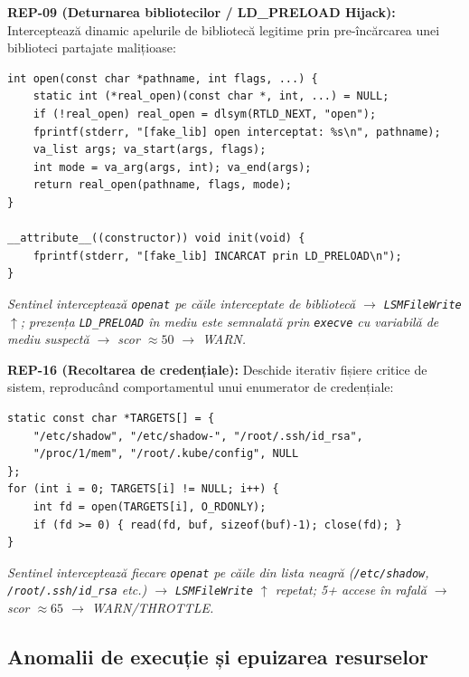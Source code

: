 \par \textbf{REP-09 (Deturnarea bibliotecilor / LD\_PRELOAD Hijack):} Interceptează dinamic apelurile de bibliotecă legitime prin pre-încărcarea unei biblioteci partajate malițioase:

\begin{lstlisting}[style=cstyle,caption={REP-09: Bibliotecă malițioasă pre-încărcată via LD\_PRELOAD}]
int open(const char *pathname, int flags, ...) {
    static int (*real_open)(const char *, int, ...) = NULL;
    if (!real_open) real_open = dlsym(RTLD_NEXT, "open");
    fprintf(stderr, "[fake_lib] open interceptat: %s\n", pathname);
    va_list args; va_start(args, flags);
    int mode = va_arg(args, int); va_end(args);
    return real_open(pathname, flags, mode);
}

__attribute__((constructor)) void init(void) {
    fprintf(stderr, "[fake_lib] INCARCAT prin LD_PRELOAD\n");
}
\end{lstlisting}
\par\textit{Sentinel interceptează \texttt{openat} pe căile interceptate de bibliotecă $\rightarrow$ \texttt{LSMFileWrite} $\uparrow$; prezența \texttt{LD\_PRELOAD} în mediu este semnalată prin \texttt{execve} cu variabilă de mediu suspectă $\rightarrow$ scor $\approx 50$ $\rightarrow$ WARN.}

\par \textbf{REP-16 (Recoltarea de credențiale):} Deschide iterativ fișiere critice de sistem, reproducând comportamentul unui enumerator de credențiale:

\begin{lstlisting}[style=cstyle,caption={REP-16: Enumerarea fișierelor cu credențiale}]
static const char *TARGETS[] = {
    "/etc/shadow", "/etc/shadow-", "/root/.ssh/id_rsa",
    "/proc/1/mem", "/root/.kube/config", NULL
};
for (int i = 0; TARGETS[i] != NULL; i++) {
    int fd = open(TARGETS[i], O_RDONLY);
    if (fd >= 0) { read(fd, buf, sizeof(buf)-1); close(fd); }
}
\end{lstlisting}
\par\textit{Sentinel interceptează fiecare \texttt{openat} pe căile din lista neagră (\texttt{/etc/shadow}, \texttt{/root/.ssh/id\_rsa} etc.) $\rightarrow$ \texttt{LSMFileWrite} $\uparrow$ repetat; 5+ accese în rafală $\rightarrow$ scor $\approx 65$ $\rightarrow$ WARN/THROTTLE.}

\subsection{Anomalii de execuție și epuizarea resurselor}
\label{subsec:attack_exec}

